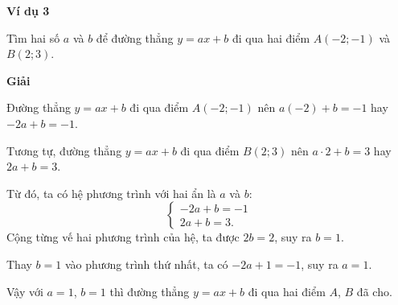 \begin{lesson}
    \textbf{Ví dụ 3}

    Tìm hai số $a$ và $b$ để đường thẳng $y=ax+b$ đi qua hai điểm $A(-2;-1)$ và $B(2;3)$.

    \textbf{Giải}

    Đường thẳng $y=ax+b$ đi qua điểm $A(-2;-1)$ nên $a(-2)+b=-1$ hay $-2a+b=-1$.

    Tương tự, đường thẳng $y=ax+b$ đi qua điểm $B(2;3)$ nên $a\cdot2+b=3$ hay $2a+b=3$.

    Từ đó, ta có hệ phương trình với hai ẩn là $a$ và $b$:
    \[
        \begin{cases}
            -2a+b=-1\\
            2a+b=3.
        \end{cases}
    \]
    Cộng từng vế hai phương trình của hệ, ta được $2b=2$, suy ra $b=1$.

    Thay $b=1$ vào phương trình thứ nhất, ta có $-2a+1=-1$, suy ra $a=1$.

    Vậy với $a=1$, $b=1$ thì đường thẳng $y=ax+b$ đi qua hai điểm $A$, $B$ đã cho.
\end{lesson}

